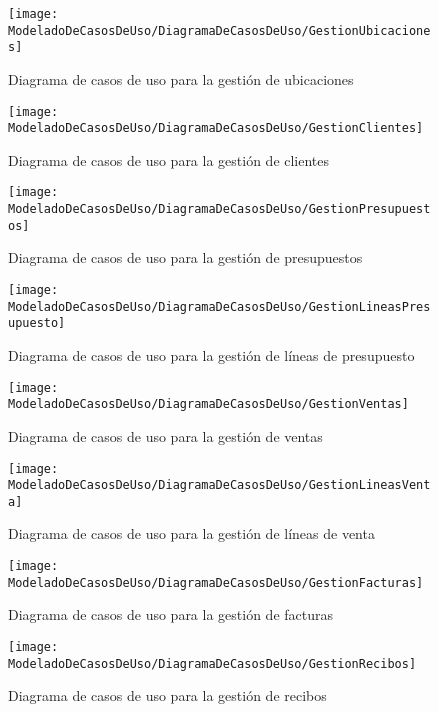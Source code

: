     \begin{figure}[H]
		\centering
		\texttt{[image: ModeladoDeCasosDeUso/DiagramaDeCasosDeUso/GestionUbicaciones]}
		\caption{Diagrama de casos de uso para la gestión de ubicaciones}
	\label{fig:GestionUbicaciones}
    \end{figure}
    \begin{figure}[H]
		\centering
		\texttt{[image: ModeladoDeCasosDeUso/DiagramaDeCasosDeUso/GestionClientes]}
		\caption{Diagrama de casos de uso para la gestión de clientes}
	\label{fig:GestionClientes}
    \end{figure}
    \begin{figure}[H]
		\centering
		\texttt{[image: ModeladoDeCasosDeUso/DiagramaDeCasosDeUso/GestionPresupuestos]}
		\caption{Diagrama de casos de uso para la gestión de presupuestos}
	\label{fig:GestionPresupuestos}
    \end{figure}
    \begin{figure}[H]
		\centering
		\texttt{[image: ModeladoDeCasosDeUso/DiagramaDeCasosDeUso/GestionLineasPresupuesto]}
		\caption{Diagrama de casos de uso para la gestión de líneas de presupuesto}
	\label{fig:GestionLineasPresupuesto}
    \end{figure}
    \begin{figure}[H]
		\centering
		\texttt{[image: ModeladoDeCasosDeUso/DiagramaDeCasosDeUso/GestionVentas]}
		\caption{Diagrama de casos de uso para la gestión de ventas}
	\label{fig:GestionVentas}
    \end{figure}
    \begin{figure}[H]
		\centering
		\texttt{[image: ModeladoDeCasosDeUso/DiagramaDeCasosDeUso/GestionLineasVenta]}
		\caption{Diagrama de casos de uso para la gestión de líneas de venta}
	\label{fig:GestionLineasVenta}
    \end{figure}
    \begin{figure}[H]
		\centering
		\texttt{[image: ModeladoDeCasosDeUso/DiagramaDeCasosDeUso/GestionFacturas]}
		\caption{Diagrama de casos de uso para la gestión de facturas}
	\label{fig:GestionFacturas}
    \end{figure}
    \begin{figure}[H]
		\centering
		\texttt{[image: ModeladoDeCasosDeUso/DiagramaDeCasosDeUso/GestionRecibos]}
		\caption{Diagrama de casos de uso para la gestión de recibos}
	\label{fig:GestionRecibos}
    \end{figure}
